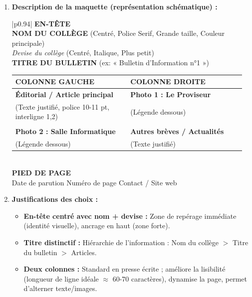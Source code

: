 \documentclass[11pt]{article}
\begin{document}
\begin{corrige}
\begin{enumerate}
\item \textbf{Description de la maquette (représentation schématique) :}
\begin{center}
\begin{tabular}{|p{0.94\linewidth}|}
\hline
\textbf{\large EN-TÊTE} \\
\hline
\textbf{NOM DU COLLÈGE} (Centré, Police Serif, Grande taille, Couleur principale) \\
\textit{Devise du collège} (Centré, Italique, Plus petit) \\
\hline
\hline
\textbf{\large TITRE DU BULLETIN} (ex: « Bulletin d'Information n°1 ») \\
\hline
\hline
\begin{tabular}{@{}p{0.48\linewidth}@{\hspace{0.04\linewidth}}p{0.48\linewidth}@{}}
\textbf{COLONNE GAUCHE} & \textbf{COLONNE DROITE} \\
\hline
\textbf{Éditorial / Article principal} & \textbf{Photo 1 : Le Proviseur} \\
(Texte justifié, police 10-11 pt, interligne 1,2) & (Légende dessous) \\
& \\
\textbf{Photo 2 : Salle Informatique} & \textbf{Autres brèves / Actualités} \\
(Légende dessous) & (Texte justifié) \\
\end{tabular} \\
\hline
\hline
\textbf{\large PIED DE PAGE} \\
\hline
Date de parution \hfill Numéro de page \hfill Contact / Site web \\
\hline
\end{tabular}
\end{center}
\item \textbf{Justifications des choix :}
\begin{itemize}
\item \textbf{En-tête centré avec nom + devise :} Zone de repérage immédiate (identité visuelle), ancrage en haut (zone forte).
\item \textbf{Titre distinctif :} Hiérarchie de l'information : Nom du collège $>$ Titre du bulletin $>$ Articles.
\item \textbf{Deux colonnes :} Standard en presse écrite ; améliore la lisibilité (longueur de ligne idéale $\approx$ 60-70 caractères), dynamise la page, permet d'alterner texte/images.

\end{itemize}
\end{enumerate}
\end{corrige}
\end{document}
